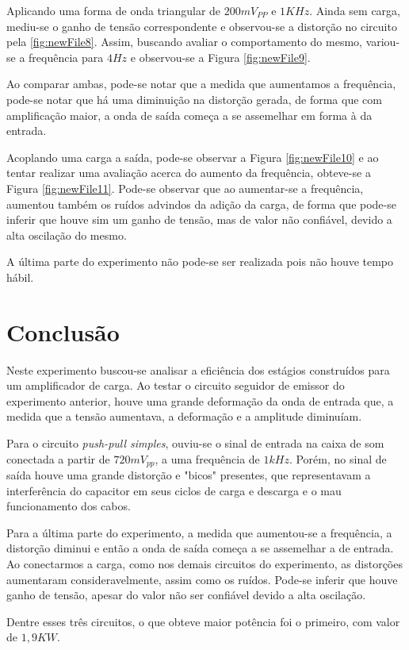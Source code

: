 \documentclass{pack}
\begin{document}
        Aplicando uma forma de onda triangular de $200mV_{PP}$ e $1KHz$. Ainda sem carga, mediu-se o ganho de tensão correspondente e observou-se a distorção no circuito pela \ref{fig:newFile8}. Assim, buscando avaliar o comportamento do mesmo, variou-se a frequência para $4Hz$ e observou-se a Figura \ref{fig:newFile9}.
        
        Ao comparar ambas, pode-se notar que a medida que aumentamos a frequência, pode-se notar que há uma diminuição na distorção gerada, de forma que com amplificação maior, a onda de saída começa a se assemelhar em forma à da entrada.
        
        Acoplando uma carga a saída, pode-se observar a Figura \ref{fig:newFile10} e ao tentar realizar uma avaliação acerca do aumento da frequência, obteve-se a Figura \ref{fig:newFile11}. Pode-se observar que ao aumentar-se a frequência, aumentou também os ruídos advindos da adição da carga, de forma que pode-se inferir que houve sim um ganho de tensão, mas de valor não confiável, devido a alta oscilação do mesmo.
        
        A última parte do experimento não pode-se ser realizada pois não houve tempo hábil.
        
    \section{Conclusão}
    Neste experimento buscou-se analisar a eficiência dos estágios construídos para um amplificador de carga. Ao testar o circuito seguidor de emissor do experimento anterior, houve uma grande deformação da onda de entrada que, a medida que a tensão aumentava, a deformação e a amplitude diminuíam.
    
    Para o circuito \emph{push-pull simples}, ouviu-se o sinal de entrada na caixa de som conectada a partir de $720mV_{pp}$, a uma frequência de $1kHz$. Porém, no sinal de saída houve uma grande distorção e "bicos" presentes, que representavam a interferência do capacitor em seus ciclos de carga e descarga e o mau funcionamento dos cabos.
    
    Para a última parte do experimento, a medida que aumentou-se a frequência, a distorção diminui e então a onda de saída começa a se assemelhar a de entrada. Ao conectarmos a carga, como nos demais circuitos do experimento, as distorções aumentaram consideravelmente, assim como os ruídos. Pode-se inferir que houve ganho de tensão, apesar do valor não ser confiável devido a alta oscilação.
    
    Dentre esses três circuitos, o que obteve maior potência foi o primeiro, com valor de $1,9KW$.
    
    
    \nocite{*}
    
    
    
    \newpage
    
    
    
    
\end{document}
